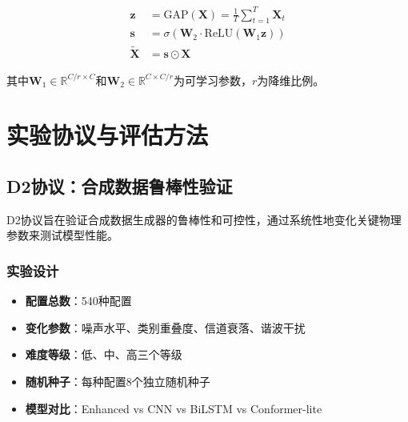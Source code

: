 \begin{align}
\mathbf{z} &= \text{GAP}(\mathbf{X}) = \frac{1}{T}\sum_{t=1}^{T}\mathbf{X}_t \\
\mathbf{s} &= \sigma(\mathbf{W}_2 \cdot \text{ReLU}(\mathbf{W}_1 \mathbf{z})) \\
\tilde{\mathbf{X}} &= \mathbf{s} \odot \mathbf{X}
\end{align}

其中$\mathbf{W}_1 \in \mathbb{R}^{C/r \times C}$和$\mathbf{W}_2 \in \mathbb{R}^{C \times C/r}$为可学习参数，$r$为降维比例。

\section{实验协议与评估方法}
\label{sec:protocols}

\subsection{D2协议：合成数据鲁棒性验证}
\label{subsec:d2_protocol}

D2协议旨在验证合成数据生成器的鲁棒性和可控性，通过系统性地变化关键物理参数来测试模型性能。

\subsubsection{实验设计}
\begin{itemize}
\item \textbf{配置总数}：540种配置
\item \textbf{变化参数}：噪声水平、类别重叠度、信道衰落、谐波干扰
\item \textbf{难度等级}：低、中、高三个等级
\item \textbf{随机种子}：每种配置8个独立随机种子
\item \textbf{模型对比}：Enhanced vs CNN vs BiLSTM vs Conformer-lite
\end{itemize}

